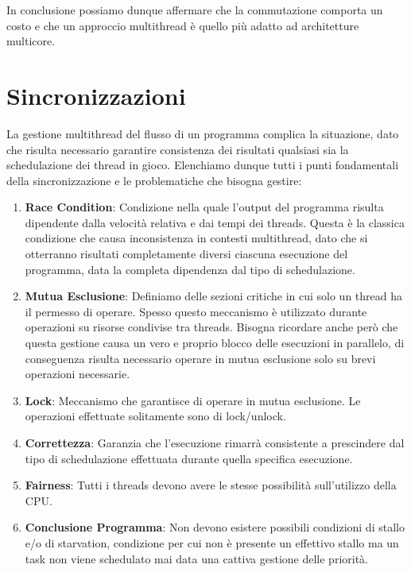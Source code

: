 \documentclass{article}
\begin{document}
In conclusione possiamo dunque affermare che la commutazione comporta un costo e che un approccio multithread è quello più adatto ad architetture multicore.

\newpage

\section{Sincronizzazioni}

La gestione multithread del flusso di un programma complica la situazione, dato che risulta necessario garantire consistenza dei risultati qualsiasi sia
la schedulazione dei thread in gioco. Elenchiamo dunque tutti i punti fondamentali della sincronizzazione e le problematiche che bisogna gestire:

\begin{enumerate}
    \item \textbf{Race Condition}: Condizione nella quale l'output del programma risulta dipendente dalla velocità relativa e dai tempi dei threads. Questa è la
    classica condizione che causa inconsistenza in contesti multithread, dato che si otterranno risultati completamente diversi ciascuna esecuzione del programma,
    data la completa dipendenza dal tipo di schedulazione.
    \item \textbf{Mutua Esclusione}: Definiamo delle sezioni critiche in cui solo un thread ha il permesso di operare. Spesso questo meccanismo è utilizzato
    durante operazioni su risorse condivise tra threads. Bisogna ricordare anche però che questa gestione causa un vero e proprio blocco delle esecuzioni in parallelo, 
    di conseguenza risulta necessario operare in mutua esclusione solo su brevi operazioni necessarie.
    \item \textbf{Lock}: Meccanismo che garantisce di operare in mutua esclusione. Le operazioni effettuate solitamente sono di lock/unlock.
    \item \textbf{Correttezza}: Garanzia che l'esecuzione rimarrà consistente a prescindere dal tipo di schedulazione effettuata durante quella specifica
    esecuzione.
    \item \textbf{Fairness}: Tutti i threads devono avere le stesse possibilità sull'utilizzo della CPU.
    \item \textbf{Conclusione Programma}: Non devono esistere possibili condizioni di stallo e/o di starvation, condizione per cui non è presente un
    effettivo stallo ma un task non viene schedulato mai data una cattiva gestione delle priorità.
\end{enumerate}
\end{document}
